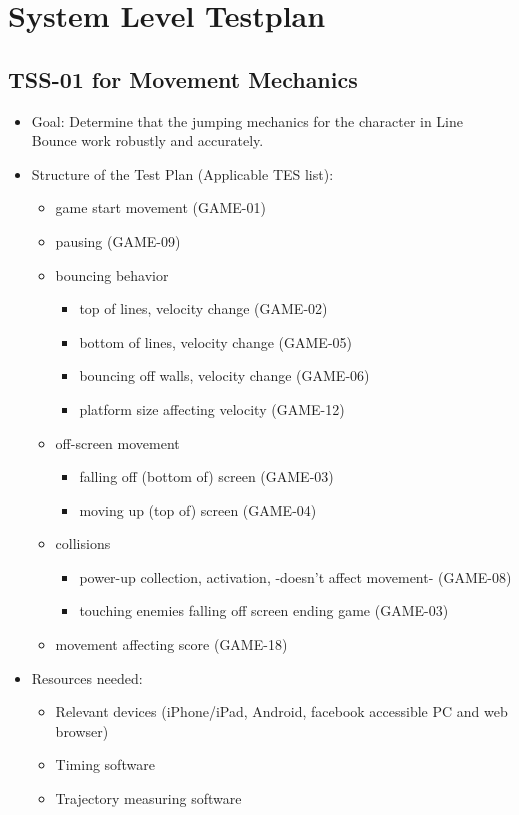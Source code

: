 \chapter{System Level Testplan}
\section{TSS-01 for Movement Mechanics}
\begin{itemize}
\item Goal: Determine that the jumping mechanics for the character in Line Bounce work robustly and accurately.

\item Structure of the Test Plan (Applicable TES list):
\begin{itemize}
\item game start movement (GAME-01)
\item pausing (GAME-09)

\item bouncing behavior
\begin{itemize}
\item top of lines, velocity change (GAME-02)
\item bottom of lines, velocity change (GAME-05)
\item bouncing off walls, velocity change (GAME-06)
\item platform size affecting velocity (GAME-12)
\end{itemize}

\item off-screen movement
\begin{itemize}
\item falling off (bottom of) screen (GAME-03)
\item moving up (top of) screen (GAME-04)
\end{itemize}

\item collisions
\begin{itemize}
\item power-up collection, activation, -doesn\textquoteright{}t affect movement- (GAME-08)
\item touching enemies falling off screen ending game (GAME-03)
\end{itemize}

\item movement affecting score (GAME-18)
\end{itemize}

\item Resources needed:
\begin{itemize}
\item Relevant devices (iPhone/iPad, Android, facebook accessible PC and web browser)
\item Timing software
\item Trajectory measuring software
\end{itemize}
\end{itemize}


